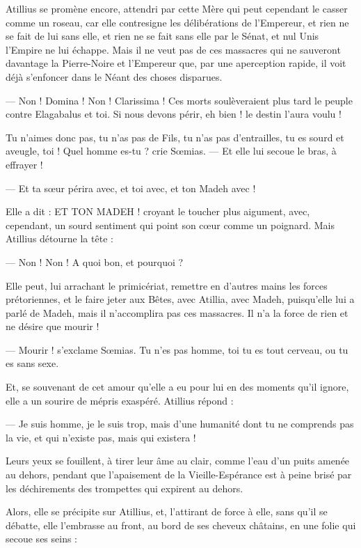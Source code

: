 \documentclass[a4paper, 11pt, oneside, polutonikogreek, french]{article}
\begin{document}
Atillius se promène encore, attendri par cette Mère qui peut cependant le casser comme un roseau, car elle contresigne les délibérations de l'Empereur, et rien ne se fait de lui sans elle, et rien ne se fait sans elle par le Sénat, et nul Unis l'Empire ne lui échappe. Mais il ne veut pas de ces massacres qui ne sauveront davantage la Pierre-Noire et l'Empereur que, par une aperception rapide, il voit déjà s'enfoncer dans le Néant des choses disparues.

--- Non ! Domina ! Non ! Clarissima ! Ces morts soulèveraient plus tard le peuple contre Elagabalus et toi. Si nous devons périr, eh bien ! le destin l'aura voulu !

Tu n'aimes donc pas, tu n'as pas de Fils, tu n'as pas d'entrailles, tu es sourd et aveugle, toi ! Quel homme es-tu ? crie Sœmias. --- Et elle lui secoue le bras, à effrayer !

--- Et ta sœur périra avec, et toi avec, et ton Madeh avec !

Elle a dit : ET TON MADEH ! croyant le toucher plus aigument, avec, cependant, un sourd sentiment qui point son cœur comme un poignard. Mais Atillius détourne la tête :

--- Non ! Non ! A quoi bon, et pourquoi ?

Elle peut, lui arrachant le primicériat, remettre en d'autres mains les forces prétoriennes, et le faire jeter aux Bêtes, avec Atillia, avec Madeh, puisqu'elle lui a parlé de Madeh, mais il n'accomplira pas ces massacres. Il n'a la force de rien et ne désire que mourir !

--- Mourir ! s'exclame Sœmias. Tu n'es pas homme, toi tu es tout cerveau, ou tu es sans sexe.

Et, se souvenant de cet amour qu'elle a eu pour lui en des moments qu'il ignore, elle a un sourire de mépris exaspéré. Atillius répond :

--- Je suis homme, je le suis trop, mais d'une humanité dont tu ne comprends pas la vie, et qui n'existe pas, mais qui existera !

Leurs yeux se fouillent, à tirer leur âme au clair, comme l'eau d'un puits amenée au dehors, pendant que l'apaisement de la Vieille-Espérance est à peine brisé par les déchirements des trompettes qui expirent au dehors.

Alors, elle se précipite sur Atillius, et, l'attirant de force à elle, sans qu'il se débatte, elle l'embrasse au front, au bord de ses cheveux châtains, en une folie qui secoue ses seins :
\end{document}
